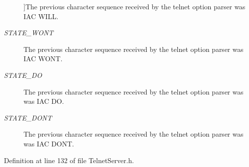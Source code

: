 \begin{Desc}
\begin{description}
{}]The previous character sequence received by the telnet option parser was I\-A\-C W\-I\-L\-L. \item[{\em 
\hypertarget{group__telnet__server_gga6a34decdb77d8c9df8ead5420ea8d326a1c98dcef9f1808d490980c9660d07356}{S\-T\-A\-T\-E\-\_\-\-W\-O\-N\-T}\label{group__telnet__server_gga6a34decdb77d8c9df8ead5420ea8d326a1c98dcef9f1808d490980c9660d07356}
}]The previous character sequence received by the telnet option parser was I\-A\-C W\-O\-N\-T. \item[{\em 
\hypertarget{group__telnet__server_gga6a34decdb77d8c9df8ead5420ea8d326a690d160db6429d82862282d94e3b4c4f}{S\-T\-A\-T\-E\-\_\-\-D\-O}\label{group__telnet__server_gga6a34decdb77d8c9df8ead5420ea8d326a690d160db6429d82862282d94e3b4c4f}
}]The previous character sequence received by the telnet option parser was was I\-A\-C D\-O. \item[{\em 
\hypertarget{group__telnet__server_gga6a34decdb77d8c9df8ead5420ea8d326a8efcfd07c99adc3da1f982af25bb6054}{S\-T\-A\-T\-E\-\_\-\-D\-O\-N\-T}\label{group__telnet__server_gga6a34decdb77d8c9df8ead5420ea8d326a8efcfd07c99adc3da1f982af25bb6054}
}]The previous character sequence received by the telnet option parser was was I\-A\-C D\-O\-N\-T. \end{description}
\end{Desc}


Definition at line 132 of file Telnet\-Server.\-h.

